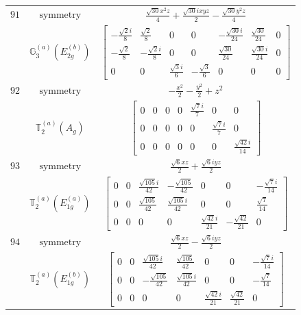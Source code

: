 \documentclass[fleqn,8pt,landscape]{jsarticle}
\begin{document}
\begin{longtable}{ccc}
$ 91 $ & $ \text{symmetry} $ & $ \frac{\sqrt{30} x^{2} z}{4} + \frac{\sqrt{30} i x y z}{2} - \frac{\sqrt{30} y^{2} z}{4} $ \\
$  $ & $ \mathbb{G}_{3}^{(a)}(E_{2g}^{(b)}) $ & $ \begin{bmatrix} - \frac{\sqrt{2} i}{8} & \frac{\sqrt{2}}{8} & 0 & 0 & - \frac{\sqrt{30} i}{24} & \frac{\sqrt{30}}{24} & 0 \\ - \frac{\sqrt{2}}{8} & - \frac{\sqrt{2} i}{8} & 0 & 0 & \frac{\sqrt{30}}{24} & \frac{\sqrt{30} i}{24} & 0 \\ 0 & 0 & \frac{\sqrt{3} i}{6} & - \frac{\sqrt{3}}{6} & 0 & 0 & 0 \end{bmatrix} $ \\ \hline
$ 92 $ & $ \text{symmetry} $ & $ - \frac{x^{2}}{2} - \frac{y^{2}}{2} + z^{2} $ \\
$  $ & $ \mathbb{T}_{2}^{(a)}(A_{g}) $ & $ \begin{bmatrix} 0 & 0 & 0 & 0 & \frac{\sqrt{7} i}{7} & 0 & 0 \\ 0 & 0 & 0 & 0 & 0 & \frac{\sqrt{7} i}{7} & 0 \\ 0 & 0 & 0 & 0 & 0 & 0 & \frac{\sqrt{42} i}{14} \end{bmatrix} $ \\ \hline
$ 93 $ & $ \text{symmetry} $ & $ \frac{\sqrt{6} x z}{2} + \frac{\sqrt{6} i y z}{2} $ \\
$  $ & $ \mathbb{T}_{2}^{(a)}(E_{1g}^{(a)}) $ & $ \begin{bmatrix} 0 & 0 & \frac{\sqrt{105} i}{42} & - \frac{\sqrt{105}}{42} & 0 & 0 & - \frac{\sqrt{7} i}{14} \\ 0 & 0 & \frac{\sqrt{105}}{42} & \frac{\sqrt{105} i}{42} & 0 & 0 & \frac{\sqrt{7}}{14} \\ 0 & 0 & 0 & 0 & \frac{\sqrt{42} i}{21} & - \frac{\sqrt{42}}{21} & 0 \end{bmatrix} $ \\ \hline
$ 94 $ & $ \text{symmetry} $ & $ \frac{\sqrt{6} x z}{2} - \frac{\sqrt{6} i y z}{2} $ \\
$  $ & $ \mathbb{T}_{2}^{(a)}(E_{1g}^{(b)}) $ & $ \begin{bmatrix} 0 & 0 & \frac{\sqrt{105} i}{42} & \frac{\sqrt{105}}{42} & 0 & 0 & - \frac{\sqrt{7} i}{14} \\ 0 & 0 & - \frac{\sqrt{105}}{42} & \frac{\sqrt{105} i}{42} & 0 & 0 & - \frac{\sqrt{7}}{14} \\ 0 & 0 & 0 & 0 & \frac{\sqrt{42} i}{21} & \frac{\sqrt{42}}{21} & 0 \end{bmatrix} $ \\ \hline

\end{longtable}
\end{document}
